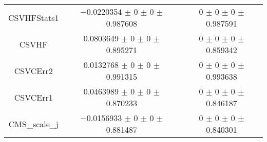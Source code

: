 \begin{table}
\begin{tabular}{ccc}
CSVHFStats1 	& \num{-0.0220354} $\pm$ \num{0} $\pm$ \num{0} $\pm$ \num{0.987608} 	& \num{0} $\pm$ \num{0} $\pm$ \num{0} $\pm$ \num{0.987591}\\
CSVHF 	& \num{0.0803649} $\pm$ \num{0} $\pm$ \num{0} $\pm$ \num{0.895271} 	& \num{0} $\pm$ \num{0} $\pm$ \num{0} $\pm$ \num{0.859342}\\
CSVCErr2 	& \num{0.0132768} $\pm$ \num{0} $\pm$ \num{0} $\pm$ \num{0.991315} 	& \num{0} $\pm$ \num{0} $\pm$ \num{0} $\pm$ \num{0.993638}\\
CSVCErr1 	& \num{0.0463989} $\pm$ \num{0} $\pm$ \num{0} $\pm$ \num{0.870233} 	& \num{0} $\pm$ \num{0} $\pm$ \num{0} $\pm$ \num{0.846187}\\
CMS\_scale\_j 	& \num{-0.0156933} $\pm$ \num{0} $\pm$ \num{0} $\pm$ \num{0.881487} 	& \num{0} $\pm$ \num{0} $\pm$ \num{0} $\pm$ \num{0.840301}\\
\bottomrule
\end{tabular}
\end{table}
